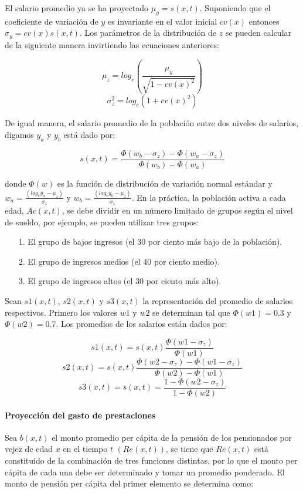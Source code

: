 \documentclass[12pt,letterpaper,titlepage]{article}
\begin{document}
{El salario promedio ya se ha proyectado $\mu_{y}=s(x,t)$. Suponiendo que el coeficiente de variación de $y$ es invariante en el valor inicial $cv(x)$ entonces $\sigma_{y}=cv(x)s(x,t)$. Los parámetros de la distribución de $z$ se pueden calcular de la siguiente manera invirtiendo las ecuaciones anteriores:

\[ \mu_{z}=log_{e}\left( \dfrac{\mu_{y}}{\sqrt{1-cv(x)^{2}}}\right)  \]
\[ \sigma_{z}^{2}=log_{e}\left( 1+cv(x)^{2}\right)  \]

De igual manera, el salario promedio de la población entre dos niveles de salarios, digamos $y_{a}$ y $y_{b}$ está dado por:

\[ s(x,t)=\dfrac{\Phi(w_{b}-\sigma_{z})-\Phi(w_{a}-\sigma_{z})}{\Phi(w_{b})-\Phi(w_{a})} \]

donde $\Phi(w)$ es la función de distribución de variación normal estándar y $w_{a}=\frac{(log_{e}y_{a}-\mu_{z})}{\sigma_{z}}$ y $w_{b}=\frac{(log_{e}y_{b}-\mu_{z})}{\sigma_{z}}$. En la práctica, la población activa a cada edad, $Ac(x,t)$, se debe dividir en un número limitado de grupos según el nivel de sueldo, por ejemplo, se pueden utilizar tres grupos:

\begin{itemize}
	\item [1.] El grupo de bajos ingresos (el 30 por ciento más bajo de la población).
	\item [2.] El grupo de ingresos medios (el 40 por ciento medio).
	\item [3.] El grupo de ingresos altos (el 30 por ciento más alto).
\end{itemize}

Sean $s1(x,t)$, $s2(x,t)$ y $s3(x,t)$ la representación del promedio de salarios respectivos. Primero los valores $w1$ y $w2$ se determinan tal que $\Phi(w1)=0.3$ y $\Phi(w2)=0.7$. Los promedios de los salarios están dados por:

\[ s1(x,t)=s(x,t)\dfrac{\Phi(w1-\sigma_{z})}{\Phi(w1)} \]
\[ s2(x,t)=s(x,t)\dfrac{\Phi(w2-\sigma_{z})-\Phi(w1-\sigma_{z})}{\Phi(w2)-\Phi(w1)} \]
\[ s3(x,t)=s(x,t)=\dfrac{1-\Phi(w2-\sigma_{z})}{1-\Phi(w2)} \]

\paragraph{Proyección del gasto de prestaciones}

Sea $b(x,t)$ el monto promedio per cápita de la pensión de los pensionados por vejez de edad $x$ en el tiempo $t$ $(Re(x,t))$, se tiene que $Re(x,t)$ está constituido de la combinación de tres funciones distintas, por lo que el monto per cápita de cada una debe ser determinado y tomar un promedio ponderado. El monto de pensión per cápita del primer elemento se determina como:

}
\end{document}

